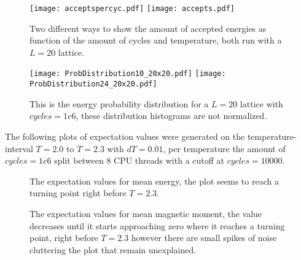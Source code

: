 \documentclass{emulateapj}
\begin{document}
%
%
\begin{figure}[H]
{{\texttt{[image: acceptspercyc.pdf]}}
}\qquad
{{\texttt{[image: accepts.pdf]}}
}\qquad
\caption{Two different ways to show the amount of accepted energies as function of the amount of cycles and temperature, both run with a $L=20$ lattice.}
\label{fig:accepts}
\end{figure}
%
%
\begin{figure}[H]
{{\texttt{[image: ProbDistribution10\_20x20.pdf]}}
}\qquad
{{\texttt{[image: ProbDistribution24\_20x20.pdf]}}
}\qquad
\caption{This is the energy probability distribution for a $L=20$ lattice with $cycles=1e6$, these distribution histograms are not normalized.}
\label{fig:PD}
\end{figure}
%
The following plots of expectation values were generated on the temperature-interval $T=2.0$ to $T=2.3$ with $dT=0.01$, per temperature the amount of $cycles=1e6$ split between 8 CPU threads with a cutoff at $cycles=10000$.
%
\begin{figure}[H]

\mbox{}

\caption{The expectation values for mean energy, the plot seems to reach a turning point right before $T=2.3$.}
\label{fig:Emean}
\end{figure}
%
%
\begin{figure}[H]

\mbox{}

\caption{The expectation values for mean magnetic moment, the value decreases until it starts approaching zero where it reaches a turning point, right before $T=2.3$ however there are small spikes of noise cluttering the plot that remain unexplained.}
\label{fig:Mmean}
\end{figure}
\end{document}
